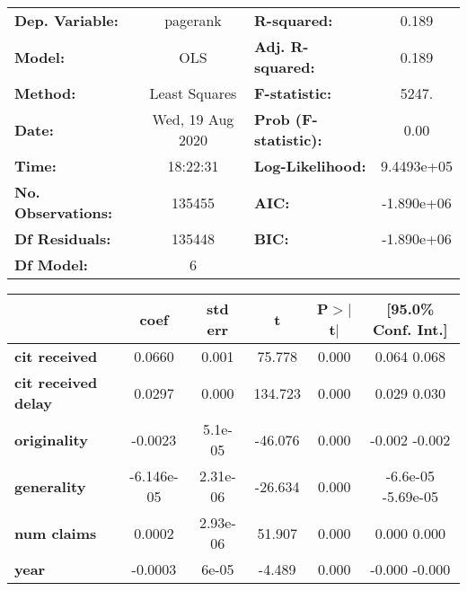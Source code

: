 \begin{center}
\begin{tabular}{lclc}
\toprule
\textbf{Dep. Variable:}     &     pagerank     & \textbf{  R-squared:         } &       0.189    \\
\textbf{Model:}             &       OLS        & \textbf{  Adj. R-squared:    } &       0.189    \\
\textbf{Method:}            &  Least Squares   & \textbf{  F-statistic:       } &       5247.    \\
\textbf{Date:}              & Wed, 19 Aug 2020 & \textbf{  Prob (F-statistic):} &       0.00     \\
\textbf{Time:}              &     18:22:31     & \textbf{  Log-Likelihood:    } &   9.4493e+05   \\
\textbf{No. Observations:}  &      135455      & \textbf{  AIC:               } &   -1.890e+06   \\
\textbf{Df Residuals:}      &      135448      & \textbf{  BIC:               } &   -1.890e+06   \\
\textbf{Df Model:}          &           6      & \textbf{                     } &                \\
\bottomrule
\end{tabular}
\begin{tabular}{lccccc}
                            & \textbf{coef} & \textbf{std err} & \textbf{t} & \textbf{P$>$$|$t$|$} & \textbf{[95.0\% Conf. Int.]}  \\
\midrule
\textbf{cit received}       &       0.0660  &        0.001     &    75.778  &         0.000        &         0.064     0.068       \\
\textbf{cit received delay} &       0.0297  &        0.000     &   134.723  &         0.000        &         0.029     0.030       \\
\textbf{originality}        &      -0.0023  &      5.1e-05     &   -46.076  &         0.000        &        -0.002    -0.002       \\
\textbf{generality}         &   -6.146e-05  &     2.31e-06     &   -26.634  &         0.000        &      -6.6e-05 -5.69e-05       \\
\textbf{num claims}         &       0.0002  &     2.93e-06     &    51.907  &         0.000        &         0.000     0.000       \\
\textbf{year}               &      -0.0003  &        6e-05     &    -4.489  &         0.000        &        -0.000    -0.000       \\

\end{tabular}
\end{center}

